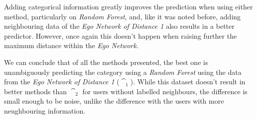 Adding categorical information greatly improves the prediction when using either method, particularly on \emph{Random Forest}, and, like it was noted before, adding neighbouring data of the \emph{Ego Network of Distance 1} also results in a better predictor. However, once again this doesn't happen when raising further the maximum distance within the \emph{Ego Network}.

We can conclude that of all the methods presented, the best one is unambiguously predicting the category using a \emph{Random Forest} using the data from the \emph{Ego Network of Distance 1} ($\cat_1$). While this dataset doesn't result in better methods than $\cat_2$ for users without labelled neighbours, the difference is small enough to be noise, unlike the difference with the users with more neughbouring information.
